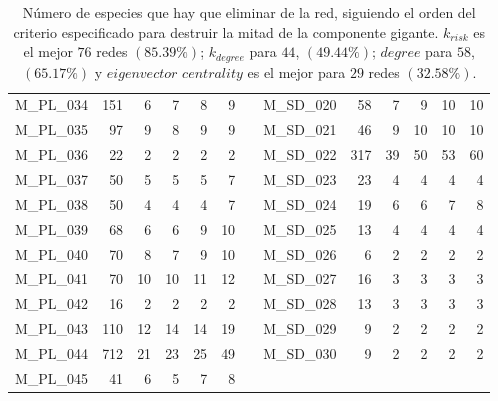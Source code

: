 \begin{table}[htbp]
\begin{tabular}{lrrrrrrrrrrrr}
    M\_PL\_034 & 151  & 6    & 7    & 8    & 9    &      & M\_SD\_020 & 58   & 7    & 9    & 10   & 10 \\
    M\_PL\_035 & 97   & 9    & 8    & 9    & 9    &      & M\_SD\_021 & 46   & 9    & 10   & 10   & 10 \\
    M\_PL\_036 & 22   & 2    & 2    & 2    & 2    &      & M\_SD\_022 & 317  & 39   & 50   & 53   & 60 \\
    M\_PL\_037 & 50   & 5    & 5    & 5    & 7    &      & M\_SD\_023 & 23   & 4    & 4    & 4    & 4 \\
    M\_PL\_038 & 50   & 4    & 4    & 4    & 7    &      & M\_SD\_024 & 19   & 6    & 6    & 7    & 8 \\
    M\_PL\_039 & 68   & 6    & 6    & 9    & 10   &      & M\_SD\_025 & 13   & 4    & 4    & 4    & 4 \\
    M\_PL\_040 & 70   & 8    & 7    & 9    & 10   &      & M\_SD\_026 & 6    & 2    & 2    & 2    & 2 \\
    M\_PL\_041 & 70   & 10   & 10   & 11   & 12   &      & M\_SD\_027 & 16   & 3    & 3    & 3    & 3 \\
    M\_PL\_042 & 16   & 2    & 2    & 2    & 2    &      & M\_SD\_028 & 13   & 3    & 3    & 3    & 3 \\
    M\_PL\_043 & 110  & 12   & 14   & 14   & 19   &      & M\_SD\_029 & 9    & 2    & 2    & 2    & 2 \\
    M\_PL\_044 & 712  & 21   & 23   & 25   & 49   &      & M\_SD\_030 & 9    & 2    & 2    & 2    & 2 \\
    M\_PL\_045 & 41   & 6    & 5    & 7    & 8    &      &      &      &      &      &      &  \\
    \bottomrule
    \end{tabular}%
    \caption{\label{table:DEST_halfgc_destruction} Número de especies que hay que eliminar de la red, siguiendo el orden del criterio especificado para destruir la mitad de la componente gigante. $k_{risk}$ es el mejor $76$ redes $(85.39\%)$; $k_{degree}$ para $44$, $(49.44\%)$; $degree$ para $58$, $(65.17\%)$ y
$eigenvector$ $centrality$ es el mejor para $29$ redes $(32.58\%)$.}

\end{table}%

